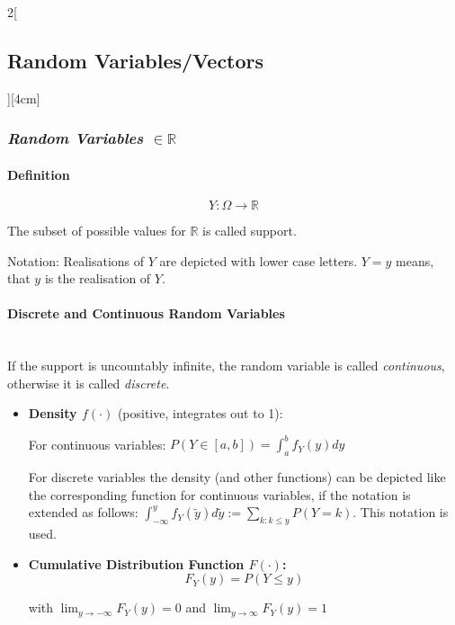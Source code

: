 \documentclass[8pt]{extarticle}
\begin{document}
\begin{multicols}{2}[\subsection{Random Variables/Vectors}][4cm]

\subsubsection*{\textit{Random Variables $\in \mathbb{R}$}}

\paragraph{Definition}

$$Y: \Omega \to \mathbb{R}$$

\noindent The subset of possible values for $\mathbb{R}$ is called support.

\noindent Notation: Realisations of $Y$ are depicted with lower case letters. $Y=y$ means, that $y$ is the realisation of $Y$.

\paragraph{Discrete and Continuous Random Variables} \ \\

\noindent If the support is uncountably infinite, the random variable is called \textit{continuous}, otherwise it is called \textit{discrete}.

\begin{itemize}
\item \textbf{Density \boldmath$f(\cdot)$} (positive, integrates out to 1): 

For continuous variables:
$P(Y \in \left[a, b\right]) = \int_{a}^{b} f_Y(y) dy$

For discrete variables the density (and other functions) can be depicted like the corresponding function for continuous variables, if the notation is extended as follows: 
$\int_{-\infty}^{y} f_Y(\tilde{y})d\tilde{y} := \sum_{k:k \leq y} P(Y=k)$. This notation is used.

\item \textbf{Cumulative Distribution Function \boldmath$F(\cdot)$:} 
$$F_Y(y) =P(Y\leq y)$$

with $\lim_{y\rightarrow-\infty}F_Y(y)=0$ and $\lim_{y\rightarrow\infty}F_Y(y)=1$
\end{itemize}


\end{multicols}
\end{document}
